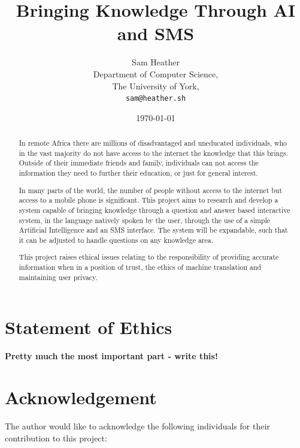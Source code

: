 \documentclass{article}
\begin{document}
\title{Bringing Knowledge Through AI and SMS}
\author{Sam Heather\\
  Department of Computer Science,\\
  The University of York,\\
  \texttt{sam@heather.sh}}
\date{\today}
\maketitle

\newpage

\begin{abstract}


In remote Africa there are millions of disadvantaged and uneducated individuals, who in the vast majority do not have access to the internet the knowledge that this brings.  Outside of their immediate friends and family, individuals can not access the information they need to further their education, or just for general interest.

In many parts of the world, the number of people without access to the internet but access to a mobile phone is significant.  This project aims to research and develop a system capable of bringing knowledge through a question and answer based interactive system, in the language natively spoken by the user, through the use of a simple Artificial Intelligence and an SMS interface.  The system will be expandable, such that it can be adjusted to handle questions on any knowledge area.

This project raises ethical issues relating to the responsibility of providing accurate information when in a position of trust, the ethics of machine translation and maintaining user privacy.
\end{abstract}

\newpage
\tableofcontents
\newpage
\listoffigures
\newpage
\listoftables
\newpage

\section*{Statement of Ethics}
{\bf Pretty much the most important part - write this!}

\newpage
\section*{Acknowledgement}
The author would like to acknowledge the following individuals for their contribution to this project:
\end{document}
